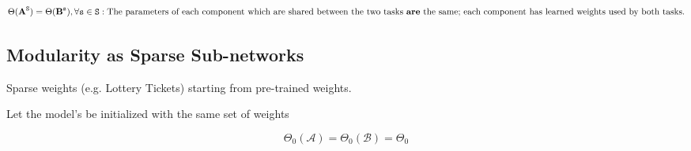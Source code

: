     

\begin{equation}
    \Theta(\textbf{A}^\mathtt{S}) = \Theta(\textbf{B}^\mathtt{s}) , \forall \mathtt{s} \in \mathtt{S} : \text{The parameters of each component which are shared between the two tasks  \textbf{are} the same;  each component has learned  weights used by both tasks.}
\end{equation}






\subsection{Modularity as Sparse Sub-networks}
Sparse weights (e.g. Lottery Tickets) starting from pre-trained weights. 


Let the model's be initialized with the same set of weights

\begin{equation}
    \Theta_0(\mathcal{A}) = \Theta_0(\mathcal{B}) = \Theta_0
\end{equation}

